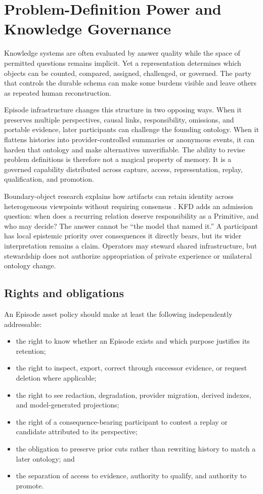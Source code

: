 \section{Problem-Definition Power and Knowledge Governance}
\label{sec:question-rights}

Knowledge systems are often evaluated by answer quality while the space of
permitted questions remains implicit. Yet a representation determines which
objects can be counted, compared, assigned, challenged, or governed. The party
that controls the durable schema can make some burdens visible and leave
others as repeated human reconstruction.

Episode infrastructure changes this structure in two opposing ways. When it
preserves multiple perspectives, causal links, responsibility, omissions, and
portable evidence, later participants can challenge the founding ontology.
When it flattens histories into provider-controlled summaries or anonymous
events, it can harden that ontology and make alternatives unverifiable. The
ability to revise problem definitions is therefore not a magical property of
memory. It is a governed capability distributed across capture, access,
representation, replay, qualification, and promotion.

Boundary-object research explains how artifacts can retain identity across
heterogeneous viewpoints without requiring consensus
\cite{star1989boundary}. KFD adds an admission question: when does a recurring
relation deserve responsibility as a Primitive, and who may decide? The answer
cannot be ``the model that named it.'' A participant has local epistemic
priority over consequences it directly bears, but its wider interpretation
remains a claim. Operators may steward shared infrastructure, but stewardship
does not authorize appropriation of private experience or unilateral ontology
change.

\subsection{Rights and obligations}

An Episode asset policy should make at least the following independently
addressable:

\begin{itemize}[leftmargin=*]
  \item the right to know whether an Episode exists and which purpose justifies
        its retention;
  \item the right to inspect, export, correct through successor evidence, or
        request deletion where applicable;
  \item the right to see redaction, degradation, provider migration, derived
        indexes, and model-generated projections;
  \item the right of a consequence-bearing participant to contest a replay or
        candidate attributed to its perspective;
  \item the obligation to preserve prior cuts rather than rewriting history to
        match a later ontology; and
  \item the separation of access to evidence, authority to qualify, and
        authority to promote.
\end{itemize}

